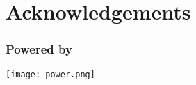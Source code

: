 
\section*{Acknowledgements}
\begin{frame}
  \frametitle{Powered by}
  \begin{center}
    \texttt{[image: power.png]}
  \end{center}
\end{frame}


